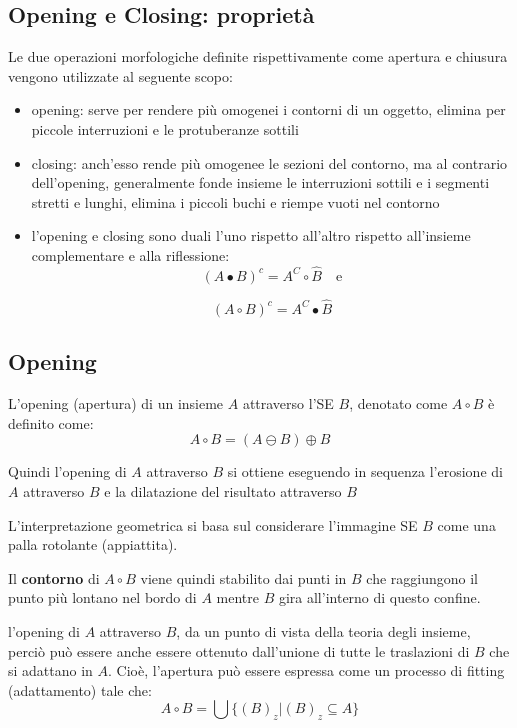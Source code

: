 \subsection{Opening e Closing: proprietà}
Le due operazioni morfologiche definite rispettivamente come apertura e chiusura vengono utilizzate al seguente scopo:
\begin{itemize}
	\item opening: serve per rendere più omogenei i contorni di un oggetto, elimina per piccole interruzioni e le protuberanze sottili
	
	\item closing: anch'esso rende più omogenee le sezioni del contorno, ma al contrario dell'opening, generalmente fonde insieme le interruzioni sottili e i segmenti stretti e lunghi, elimina i piccoli buchi e riempe vuoti nel contorno
	
	\item l'opening e closing sono duali l'uno rispetto all'altro rispetto all'insieme complementare e alla riflessione:
	$$
	(A \bullet B)^c = A^C \circ \hat B \quad \text{e}
	$$
	
	$$
	(A \circ B)^c = A^C \bullet \hat B
	$$
\end{itemize}

\subsection{Opening}
L'opening (apertura) di un insieme $A$ attraverso l'SE $B$, denotato come $A \circ B$ è definito come:
$$
A \circ B = (A \ominus B) \oplus B
$$

Quindi l'opening di $A$ attraverso $B$ si ottiene eseguendo in sequenza l'erosione di $A$ attraverso $B$ e la dilatazione del risultato attraverso $B$

L'interpretazione geometrica si basa sul considerare l'immagine SE $B$ come una palla rotolante (appiattita).

Il \textbf{contorno} di $A \circ B$ viene quindi stabilito dai punti in $B$ che raggiungono il punto più lontano nel bordo di $A$ mentre $B$ gira all'interno di questo confine.

l'opening di $A$ attraverso $B$, da un punto di vista della teoria degli insieme, perciò può essere anche essere ottenuto dall'unione di tutte le traslazioni di $B$ che si adattano in $A$. Cioè, l'apertura può essere espressa come un processo di fitting (adattamento) tale che:
$$
A \circ B = \bigcup \{(B)_z | (B)_z \subseteq A \}
$$

